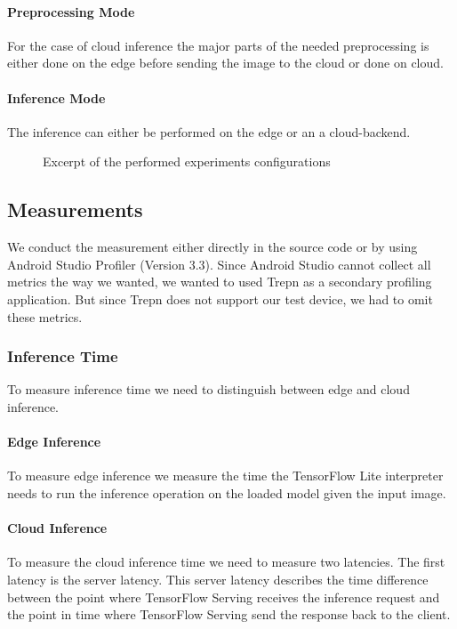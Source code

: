\paragraph{Preprocessing Mode}
For the case of cloud inference the major parts of the needed preprocessing is either done on the edge before sending the image to the cloud or done on cloud.
\paragraph{Inference Mode}
The inference can either be performed on the edge or an a cloud-backend.

\begin{figure}[H]
\centering
 \scalebox{.7}{}

\caption{Excerpt of the performed experiments configurations}
\label{fig:tree}
\end{figure}
\subsection{Measurements}
\label{chap:insta_measurements}
We conduct the measurement either directly in the source code or by using Android Studio Profiler (Version 3.3). Since Android Studio cannot collect all metrics the way we wanted, we wanted to used Trepn as a secondary profiling application. But since Trepn does not support our test device, we had to omit these metrics.
\subsubsection{Inference Time}
To measure inference time we need to  distinguish between edge and cloud inference.
\paragraph{Edge Inference}To measure edge inference we measure the time the TensorFlow Lite interpreter needs to run the inference operation on the loaded model given the input image.
\paragraph{Cloud Inference}
To measure the cloud inference time we need to measure two latencies. The first latency is the server latency. This server latency describes the time difference between the point where TensorFlow Serving receives the inference request and the point in time where TensorFlow Serving send the response back to the client.



